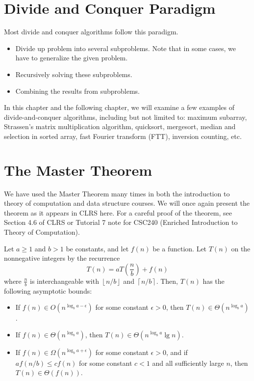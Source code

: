 \section{Divide and Conquer Paradigm}

Most divide and conquer algorithms follow this paradigm.

\begin{itemize}
    \item Divide up problem into several subproblems. Note that in some cases, we have to generalize the given problem.
    \item Recursively solving these subproblems.
    \item Combining the results from subproblems.
\end{itemize}

In this chapter and the following chapter, we will examine a few examples of divide-and-conquer algorithms, including but not limited to: maximum subarray, Strassen's matrix multiplication algorithm, quicksort, mergesort, median and selection in sorted array, fast Fourier transform (FTT), inversion counting, etc.

\section{The Master Theorem}

We have used the Master Theorem many times in both the introduction to theory of computation and data structure courses. We will once again present the theorem as it appears in CLRS here. For a careful proof of the theorem, see Section 4.6 of CLRS or Tutorial 7 note for CSC240 (Enriched Introduction to Theory of Computation).

\begin{theorem}
    Let $a\geq 1$ and $b>1$ be constants, and let $f(n)$ be a function. Let $T(n)$ on the nonnegative integers by the recurrence
    $$
    T(n) = aT\left( \frac{n}{b} \right) + f(n)
    $$
    where $\frac{n}{b}$ is interchangeable with $\left\lfloor n/b \right\rfloor$ and $\left\lceil n/b \right\rceil $. Then, $T(n)$ has the following asymptotic bounds:
    \begin{itemize}
        \item If $f(n) \in O(n^{\log_b a - \epsilon})$ for some constant $\epsilon > 0$, then $T(n) \in \Theta(n^{\log_b a})$.
        \item If $f(n) \in \Theta(n^{\log_b a})$, then $T(n) \in \Theta(n^{\log_b a} \lg n)$.
        \item If $f(n) \in \Omega(n^{\log_b a+\epsilon})$ for some constant $\epsilon > 0$, and if $af(n/b) \leq cf(n)$ for some constant $c < 1$ and all sufficiently large $n$, then $T(n) \in \Theta(f(n))$. 
    \end{itemize}
\end{theorem}

